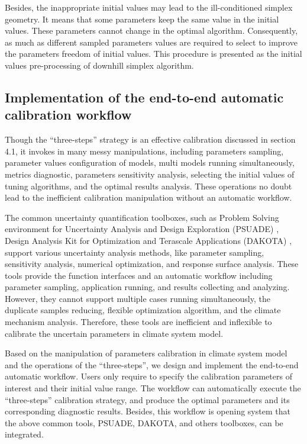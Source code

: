 \documentclass[gmd, manuscript]{copernicus}
\begin{document}
Besides, the inappropriate initial values may lead to the ill-conditioned simplex geometry. It means that some parameters keep the same value in the initial values. These parameters cannot change in the optimal algorithm. Consequently, as much as different sampled parameters values are required to select to improve the parameters freedom of initial values. This procedure is presented as the initial values pre-processing of downhill simplex algorithm.


\subsection{Implementation of the end-to-end automatic calibration workflow}

Though the ``three-steps'' strategy is an effective calibration discussed in section 4.1, it invokes in many messy manipulations, including parameters sampling, parameter values configuration of models, multi models running simultaneously, metrics diagnostic, parameters sensitivity analysis, selecting the initial values of tuning algorithms, and the optimal results analysis. These operations no doubt lead to the inefficient calibration manipulation without an automatic workflow.

The common uncertainty quantification toolboxes, such as Problem Solving environment for Uncertainty Analysis and Design Exploration (PSUADE) \citep{tong2005psuade}, Design Analysis Kit for Optimization and Terascale Applications (DAKOTA) \citep{eldred2007investigation}, support various uncertainty analysis methods, like parameter sampling, sensitivity analysis, numerical optimization, and response surface analysis.  These tools provide the function interfaces and an automatic workflow including parameter sampling, application running, and results collecting and analyzing. However, they cannot support multiple cases running simultaneously, the duplicate samples reducing, flexible optimization algorithm, and the climate mechanism analysis. Therefore, these tools are inefficient and inflexible to calibrate the uncertain parameters in climate system model.   

Based on the manipulation of parameters calibration in climate system model and the operations of the ``three-steps'', we design and implement the end-to-end automatic workflow. Users only require to specify the calibration parameters of interest and their initial value range. The workflow can automatically execute the ``three-steps'' calibration strategy, and produce the optimal parameters and its corresponding diagnostic results. Besides, this workflow is opening system that the above common tools, PSUADE, DAKOTA, and others toolboxes, can be integrated.
\end{document}
